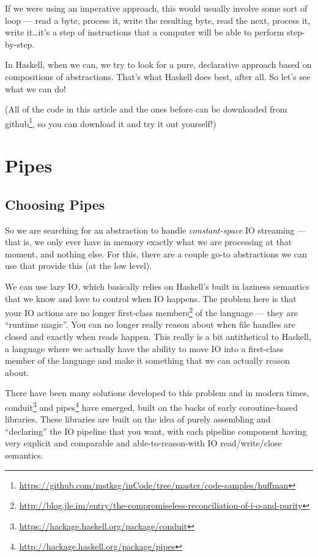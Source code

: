\documentclass[]{article}
\renewcommand{\href}[2]{#2\footnote{\url{#1}}}
\begin{document}
If we were using an imperative approach, this would usually involve some sort of
loop --- read a byte, process it, write the resulting byte, read the next,
process it, write it\ldots it's a step of instructions that a computer will be
able to perform step-by-step.

In Haskell, when we can, we try to look for a pure, declarative approach based
on compositions of abstractions. That's what Haskell does best, after all. So
let's see what we can do!

(All of the code in this article and the ones before can be downloaded
\href{https://github.com/mstksg/inCode/tree/master/code-samples/huffman}{from
github}, so you can download it and try it out yourself!)

\section{Pipes}\label{pipes}

\subsection{Choosing Pipes}\label{choosing-pipes}

So we are searching for an abstraction to handle \emph{constant-space} IO
streaming --- that is, we only ever have in memory exactly what we are
processing at that moment, and nothing else. For this, there are a couple go-to
abstractions we can use that provide this (at the low level).

We can use lazy IO, which basically relies on Haskell's built in laziness
semantics that we know and love to control when IO happens. The problem here is
that your IO actions are no longer
\href{http://blog.jle.im/entry/the-compromiseless-reconciliation-of-i-o-and-purity}{first-class
members} of the language --- they are ``runtime magic''. You can no longer
really reason about when file handles are closed and exactly when reads happen.
This really is a bit antithetical to Haskell, a language where we actually have
the ability to move IO into a first-class member of the language and make it
something that we can actually reason about.

There have been many solutions developed to this problem and in modern times,
\href{https://hackage.haskell.org/package/conduit}{conduit} and
\href{http://hackage.haskell.org/package/pipes}{pipes} have emerged, built on
the backs of early coroutine-based libraries. These libraries are built on the
idea of purely assembling and ``declaring'' the IO pipeline that you want, with
each pipeline component having very explicit and comparable and
able-to-reason-with IO read/write/close semantics.
\end{document}

